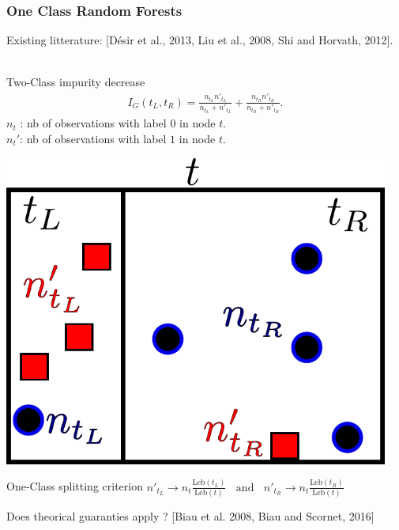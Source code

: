 \documentclass[9pt]{beamer}
\newcommand\blue{\color{blue} }
\def\leb{\text{Leb}}
\begin{document}
\begin{frame}
\frametitle{One Class Random Forests}

Existing litterature:
{\small [Désir et al., 2013, Liu et al., 2008, Shi and Horvath, 2012].}\\~\\
%

\begin{minipage}{0.65\textwidth}
{\blue Two-Class impurity decrease} 
\begin{align*}
I_G(t_L, t_R)= \frac{n_{t_L} n'_{t_L}}{n_{t_L} +  n'_{t_L}} + \frac{n_{t_R} n'_{t_R}}{n_{t_R} +  n'_{t_R}}.
\end{align*}
$n_t$ : nb of observations with label $0$ in node $t$.\\
$n_t'$: nb of observations with label $1$ in node $t$.

\end{minipage}
\begin{minipage}{0.3\textwidth}
	\centering
	\includegraphics[width=0.95\textwidth]{sourcefigs/tree.pdf}
\end{minipage}

\begin{block}{One-Class splitting criterion }%
$n'_{t_L} \to n_{t} \frac{\leb(t_L)}{\leb(t)} ~~~~\text{and}~~~~
n'_{t_R} \to n_{t} \frac{\leb(t_R)}{\leb(t)}
$%


\end{block}
%
Does theorical guaranties apply ?
{\small [Biau et al. 2008, Biau and Scornet, 2016]}

\end{frame}
\end{document}
